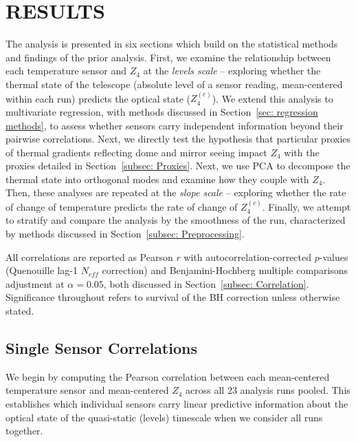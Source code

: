 \documentclass[SE,authoryear,toc]{lsstdoc}
\begin{document}
\section{RESULTS}
\label{sec: Results}

The analysis is presented in six sections which build on the statistical methods and findings of the prior analysis. First, we examine the relationship between each temperature sensor and $Z_4$ at the \textit{levels scale} -- exploring whether the thermal state of the telescope (absolute level of a sensor reading, mean-centered within each run) predicts the optical state ($Z_4^{(c)}$). We extend this analysis to multivariate regression, with methods discussed in Section~\ref{sec: regression methods}, to assess whether sensors carry independent information beyond their pairwise correlations. Next, we directly test the hypothesis that particular proxies of thermal gradients reflecting dome and mirror seeing impact $Z_4$ with the proxies detailed in Section~\ref{subsec: Proxies}. Next, we use PCA to decompose the thermal state into orthogonal modes and examine how they couple with $Z_4$. Then, these analyses are repeated at the \textit{slope scale} -- exploring whether the rate of change of temperature predicts the rate of change of $Z_4^{(c)}$. Finally, we attempt to stratify and compare the analysis by the smoothness of the run, characterized by methods discussed in Section~\ref{subsec: Preprocessing}.

All correlations are reported as Pearson $r$ with autocorrelation-corrected $p$-values (Quenouille lag-1 $N_{eff}$ correction) and Benjamini-Hochberg multiple comparisons adjustment at $\alpha = 0.05$, both discussed in Section~\ref{subsec: Correlation}. Significance throughout refers to survival of the BH correction unless otherwise stated.


\subsection{Single Sensor Correlations}
\label{subsec: single sensor}

We begin by computing the Pearson correlation between each mean-centered temperature sensor and mean-centered $Z_4$ across all 23 analysis runs pooled. This establishes which individual sensors carry linear predictive information about the optical state of the quasi-static (levels) timescale when we consider all runs together. 
\end{document}
